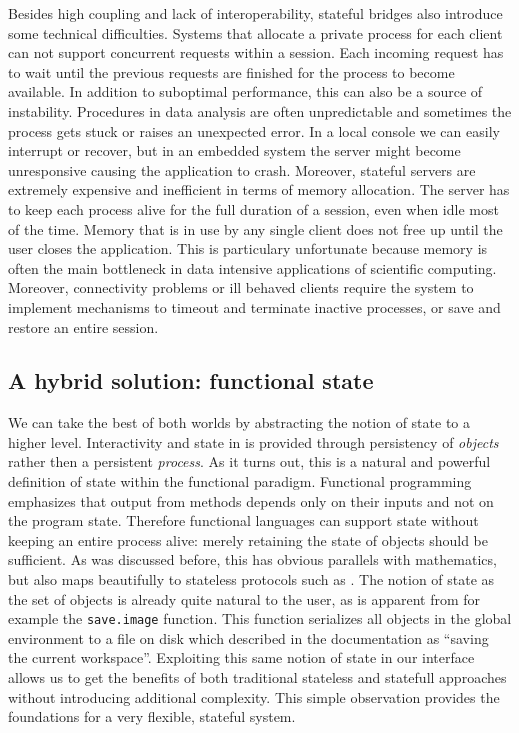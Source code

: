 Besides high coupling and lack of interoperability, stateful bridges also introduce some technical difficulties. Systems that allocate a private \R process for each client can not support concurrent requests within a session. Each incoming request has to wait until the previous requests are finished for the process to become available. In addition to suboptimal performance, this can also be a source of instability. Procedures in data analysis are often unpredictable and sometimes the \R process gets stuck or raises an unexpected error. In a local console we can easily interrupt or recover, but in an embedded system the server might become unresponsive causing the application to crash. Moreover, stateful servers are extremely expensive and inefficient in terms of memory allocation. The server has to keep each \R process alive for the full duration of a session, even when idle most of the time. Memory that is in use by any single client does not free up until the user closes the application. This is particulary unfortunate because memory is often the main bottleneck in data intensive applications of scientific computing. Moreover, connectivity problems or ill behaved clients require the system to implement mechanisms to timeout and terminate inactive processes, or save and restore an entire session.

\subsection{A hybrid solution: functional state}

We can take the best of both worlds by abstracting the notion of state to a higher level. Interactivity and state in \OpenCPU is provided through persistency of \emph{objects} rather then a persistent \emph{process}. As it turns out, this is a natural and powerful definition of state within the functional paradigm. Functional programming emphasizes that output from methods depends only on their inputs and not on the program state. Therefore functional languages can support state without keeping an entire process alive: merely retaining the state of objects should be sufficient. As was discussed before, this has obvious parallels with mathematics, but also maps beautifully to stateless protocols such as \HTTP. The notion of state as the set of objects is already quite natural to the \R user, as is apparent from for example the \texttt{save.image} function. This function serializes all objects in the global environment to a file on disk which described in the documentation as ``saving the current workspace''. Exploiting this same notion of state in our interface allows us to get the benefits of both traditional stateless and statefull approaches without introducing additional complexity. This simple observation provides the foundations for a very flexible, stateful \RPC system.

